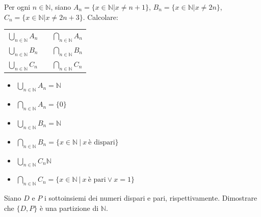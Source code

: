 
\begin{esercizio}
Per ogni $n\in\mathbb{N}$, siano $A_n=\{x\in \mathbb{N} | x\neq n+1\}$, $B_n=\{x\in\mathbb{N} | x\neq 2n\}$, $C_n=\{x\in\mathbb{N} | x\neq 2n+3\}$.
Calcolare:
\begin{center}
    \begin{tabular}{lcl}
        \medskip
        $\bigcup_{n\in\mathbb{N}}A_n$ && $\bigcap_{n\in\mathbb{N}}A_n$\\
        \medskip
        $\bigcup_{n\in\mathbb{N}}B_n$ && $\bigcap_{n\in\mathbb{N}}B_n$\\ 
        \medskip
        $\bigcup_{n\in\mathbb{N}}C_n$ && $\bigcap_{n\in\mathbb{N}}C_n$\\
    \end{tabular}
\end{center}

\end{esercizio}

\begin{soluzione}
    \begin{itemize}
\item $\bigcup_{n\in\mathbb{N}}A_n = \mathbb{N}$ 
\item $\bigcap_{n\in\mathbb{N}}A_n = \{0\}$
\item $\bigcup_{n\in\mathbb{N}}B_n = \mathbb{N}$
\item $\bigcap_{n\in\mathbb{N}}B_n = \{x\in\mathbb{N}\ |\ x\ \text{è\ dispari}\}$
\item $\bigcup_{n\in\mathbb{N}}C_n \mathbb{N}$
\item $\bigcap_{n\in\mathbb{N}}C_n = \{x\in\mathbb{N}\ |\ x\ \text{è\ pari} \vee x=1\}$
\end{itemize}

\end{soluzione}


\begin{esercizio}
Siano $D$ e $P$ i sottoinsiemi dei numeri dispari e pari, rispettivamente. Dimostrare che $\{D, P\}$ è una partizione di $\mathbb{N}$.
\end{esercizio}

